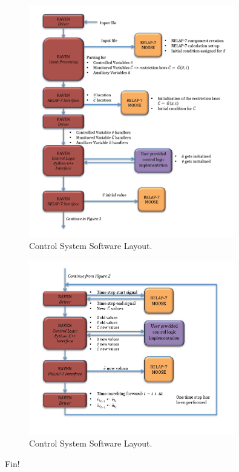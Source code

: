 \documentclass{mc2013}
\begin{document}
\begin{figure}[h] 
  \centering
     \includegraphics[width=0.8\textwidth]{figures/CalculationFlow_part_1.PNG}
  \caption{Control System Software Layout.}
  \label{fig:CalcFlow1}
\end{figure}

\begin{figure}[h] 
  \centering
     \includegraphics[width=0.8\textwidth]{figures/CalculationFlow_part_2.PNG}
  \caption{Control System Software Layout.}
  \label{fig:CalcFlow2}
\end{figure}


Fin!
\end{document}
